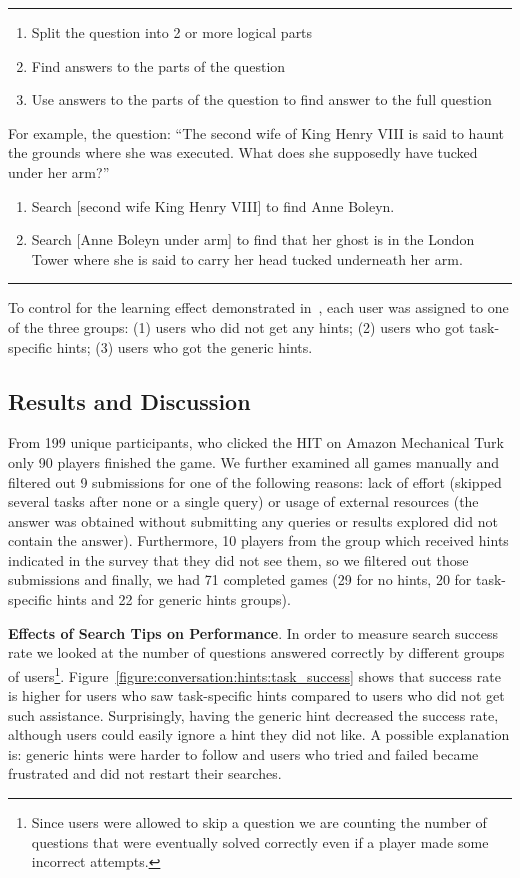 \hrule
\begin{enumerate}
\item Split the question into 2 or more logical parts
\item Find answers to the parts of the question
\item Use answers to the parts of the question to find answer to the full question
\end{enumerate}

For example, the question: ``The second wife of King Henry VIII is said to haunt the grounds where she was executed. What does she supposedly have tucked under her arm?''
\begin{enumerate}
\item Search [second wife King Henry VIII] to find Anne Boleyn.
\item Search [Anne Boleyn under arm] to find that her ghost is in the London Tower where she is said to carry her head tucked underneath her arm.
\end{enumerate}
\hrule
\vspace{5mm}

To control for the learning effect demonstrated in~\cite{Moraveji:2011:MIU:2009916.2009966}, each user was assigned to one of the three groups: (1) users who did not get any hints; (2) users who got task-specific hints; (3) users who got the generic hints.


\subsection{Results and Discussion}
\label{section:conversation:hints:results}

From 199 unique participants, who clicked the HIT on Amazon Mechanical Turk only 90 players finished the game.
We further examined all games manually and filtered out 9 submissions for one of the following reasons: lack of effort (\eg skipped several tasks after none or a single query) or usage of external resources (\eg the answer was obtained without submitting any queries or results explored did not contain the answer).
Furthermore, 10 players from the group which received hints indicated in the survey that they did not see them, so we filtered out those submissions and finally, we had 71 completed games (29 for no hints, 20 for task-specific hints and 22 for generic hints groups).

\textbf{Effects of Search Tips on Performance}.
In order to measure search success rate we looked at the number of questions answered correctly by different groups of users\footnote{Since users were allowed to skip a question we are counting the number of questions that were eventually solved correctly even if a player made some incorrect attempts.}.
Figure~\ref{figure:conversation:hints:task_success} shows that success rate is higher for users who saw task-specific hints compared to users who did not get such assistance.
Surprisingly, having the generic hint decreased the success rate, although users could easily ignore a hint they did not like.
A possible explanation is: generic hints were harder to follow and users who tried and failed became frustrated and did not restart their searches.

